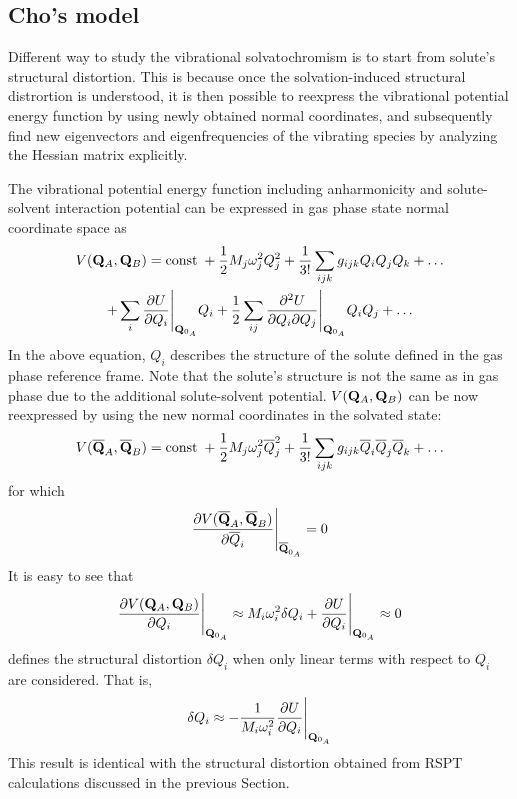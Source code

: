 \documentclass[a4paper,titlepage,twoside,fleqn,12pt]{book}
\begin{document}
\begin{refsection}
\section{Cho's model}

Different way to study the vibrational solvatochromism is to start from
solute's structural distortion. 
This is because once the solvation-induced structural distrortion is 
understood, it is then possible to reexpress the vibrational potential energy function
by using newly obtained normal coordinates, and subsequently find new eigenvectors and eigenfrequencies
of the vibrating species by analyzing the Hessian matrix explicitly.

The vibrational potential energy function including anharmonicity 
and solute-solvent interaction potential
can be expressed in gas phase state normal coordinate space as
%
\begin{multline} \label{e:vib-pot-energy-function}
 V({\bf Q}_A,{\bf Q}_B) = {\rm const}\;+
\frac{1}{2} M_j \omega_j^2 Q_j^2 + \frac{1}{3!} \sum_{ijk}  g_{ijk} Q_iQ_jQ_k + \ldots \\
+ \sum_i \frac{\partial U}{\partial Q_i} \Bigg|_{{\bf Q}_{0_A}} Q_i
+ \frac{1}{2} \sum_{ij} \frac{\partial^2 U}{\partial Q_i \partial Q_j} \Bigg|_{{\bf Q}_{0_A}} Q_iQ_j
+ \ldots
\end{multline}
%
In the above equation, $Q_i$ describes the structure of the solute
defined in the gas phase reference frame. Note that the solute's structure 
is not the same as in gas phase due to the additional solute\hyp{}solvent potential.
$V({\bf Q}_A,{\bf Q}_B)$ can be now reexpressed by using the new normal coordinates in the solvated
state:
%
\begin{equation} \label{e:vib-pot-energy-function-new}
V(\overline{{\bf Q}}_A,\overline{{\bf Q}}_B) = {\rm const}\;+
\frac{1}{2} M_j \omega_j^2 \overline{Q}_j^2 + \frac{1}{3!} \sum_{ijk}  g_{ijk} \overline{Q}_i\overline{Q}_j\overline{Q}_k + \ldots
\end{equation}
%
for which 
%
\begin{equation} \label{e:vib-pot-energy-function-new.condition}
\frac{\partial V(\overline{{\bf Q}}_A,\overline{{\bf Q}}_B)}
{\partial \overline{Q}_i} \Bigg|_{{\bf \overline{Q}}_{0_A}} = 0
\end{equation}
%
It is easy to see that
%
\begin{equation} \label{e:x863}
\frac{\partial V({{\bf Q}}_A,{{\bf Q}}_B)}
{\partial Q_i} \Bigg|_{{\bf Q}_{0_A}} \approx 
M_i \omega_i^2 \delta Q_i + \frac{\partial U}{\partial Q_i} \Bigg|_{{\bf Q}_{0_A}} 
\approx 0
\end{equation}
%
defines the structural distortion $\delta Q_i$ when only linear terms with respect to $Q_i$
are considered. That is,
%
\begin{equation} \label{e:struct-dist-cho}
\delta Q_i \approx - \frac{1}{M_i \omega_i^2} \frac{\partial U}{\partial Q_i} \Bigg|_{{\bf Q}_{0_A}} 
\end{equation}
%
This result is identical with the structural distortion
obtained from RSPT calculations discussed in the previous Section.


\end{refsection}
\end{document}
